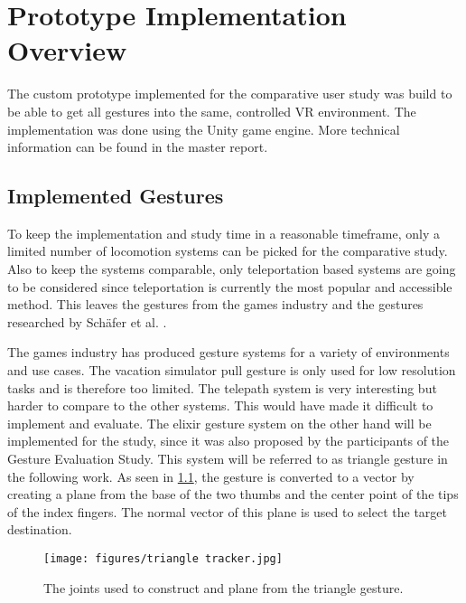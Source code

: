 \chapter{Prototype Implementation Overview}
\label{cha:ImplementationOverview}
The custom prototype implemented for the comparative user study was build to be able to get all gestures into the same, controlled VR environment. The implementation was done using the Unity game engine. More technical information can be found in the master report. 

\section{Implemented Gestures}

To keep the implementation and study time in a reasonable timeframe, only a limited number of locomotion systems can be picked for the comparative study. Also to keep the systems comparable, only teleportation based systems are going to be considered since teleportation is currently the most popular and accessible method. This leaves the gestures from the games industry and the gestures researched by Schäfer et al. \cite{Schafer2021}. 

The games industry has produced gesture systems for a variety of environments and use cases. The vacation simulator pull gesture is only used for low resolution tasks and is therefore too limited. The telepath system is very interesting but harder to compare to the other systems. This would have made it difficult to implement and evaluate. %
The elixir gesture system on the other hand will be implemented for the study, since it was also proposed by the participants of the Gesture Evaluation Study.  %
This system will be referred to as triangle gesture in the following work. As seen in \ref{fig:triangleTracker}, the gesture is converted to a vector by creating a plane from the base of the two thumbs and the center point of the tips of the index fingers. The normal vector of this plane is used to select the target destination.

\begin{figure}[!ht]
    \centering
    \texttt{[image: figures/triangle tracker.jpg]}
    \caption{The joints used to construct and plane from the triangle gesture.}
    \label{fig:triangleTracker}
\end{figure}

